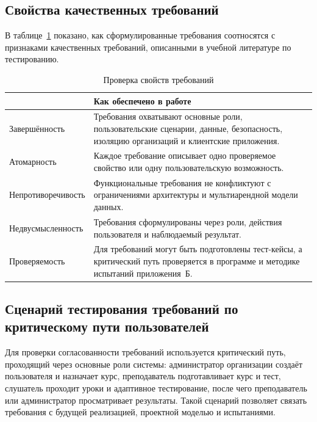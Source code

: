 \subsection{Свойства качественных требований}

В таблице~\ref{tab:req-quality} показано, как сформулированные требования соотносятся с признаками качественных требований, описанными в учебной литературе по тестированию\cite{kulikov_testing_2024}.

\begin{table}[H]
\centering
\caption{Проверка свойств требований}
\label{tab:req-quality}
{\fontsize{12pt}{12pt}\selectfont
\setlength{\tabcolsep}{6pt}
\renewcommand{\arraystretch}{1.15}
\begin{tabularx}{\textwidth}{|>{\RaggedRight\arraybackslash}p{46mm}|>{\RaggedRight\arraybackslash}X|}
\hline
{\centering\arraybackslash\textbf{Свойство}} & {\centering\arraybackslash\textbf{Как обеспечено в работе}} \\
\hline
Завершённость & Требования охватывают основные роли, пользовательские сценарии, данные, безопасность, изоляцию организаций и клиентские приложения. \\
\hline
Атомарность & Каждое требование описывает одно проверяемое свойство или одну пользовательскую возможность. \\
\hline
Непротиворечивость & Функциональные требования не конфликтуют с ограничениями архитектуры и мультиарендной модели данных. \\
\hline
Недвусмысленность & Требования сформулированы через роли, действия пользователя и наблюдаемый результат. \\
\hline
Проверяемость & Для требований могут быть подготовлены тест-кейсы, а критический путь проверяется в программе и методике испытаний приложения~Б. \\
\hline
\end{tabularx}
}
\end{table}

\subsection{Сценарий тестирования требований по критическому пути пользователей}

Для проверки согласованности требований используется критический путь, проходящий через основные роли системы: администратор организации создаёт пользователя и назначает курс, преподаватель подготавливает курс и тест, слушатель проходит уроки и адаптивное тестирование, после чего преподаватель или администратор просматривает результаты. Такой сценарий позволяет связать требования с будущей реализацией, проектной моделью и испытаниями.

